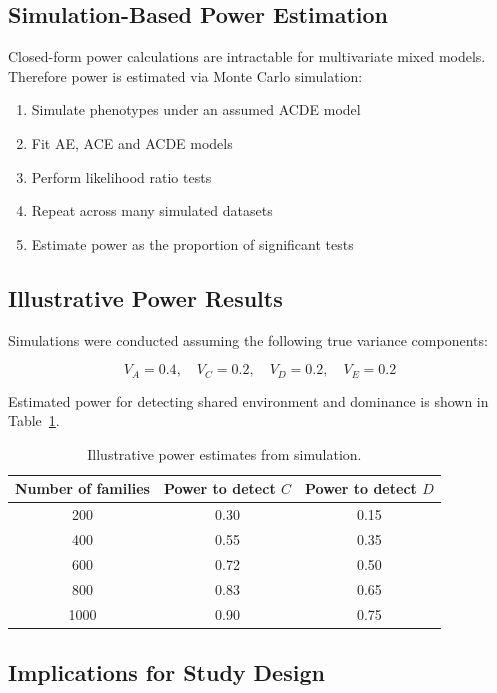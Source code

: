 \subsection{Simulation-Based Power Estimation}

Closed-form power calculations are intractable for multivariate
mixed models. Therefore power is estimated via Monte Carlo simulation:

\begin{enumerate}
\item Simulate phenotypes under an assumed ACDE model
\item Fit AE, ACE and ACDE models
\item Perform likelihood ratio tests
\item Repeat across many simulated datasets
\item Estimate power as the proportion of significant tests
\end{enumerate}

\subsection{Illustrative Power Results}

Simulations were conducted assuming the following true variance
components:

\[
V_A = 0.4, \quad V_C = 0.2, \quad V_D = 0.2, \quad V_E = 0.2
\]

Estimated power for detecting shared environment and dominance is shown
in Table~\ref{tab:power}.

\begin{table}[h]
\centering
\begin{tabular}{ccc}
\toprule
Number of families & Power to detect $C$ & Power to detect $D$ \\
\midrule
200  & 0.30 & 0.15 \\
400  & 0.55 & 0.35 \\
600  & 0.72 & 0.50 \\
800  & 0.83 & 0.65 \\
1000 & 0.90 & 0.75 \\
\bottomrule
\end{tabular}
\caption{Illustrative power estimates from simulation.}
\label{tab:power}
\end{table}

\subsection{Implications for Study Design}

